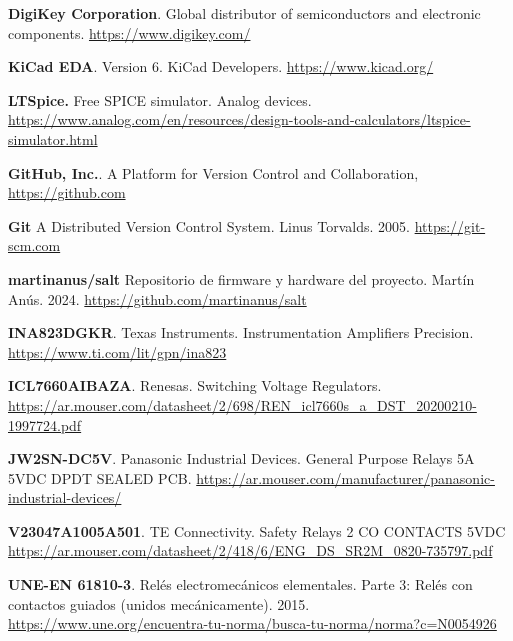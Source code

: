 \begin{thebibliography}{30}
\textbf{DigiKey Corporation}. Global distributor of semiconductors and electronic components. \href{https://www.digikey.com/}{https://www.digikey.com/}


\textbf{KiCad EDA}. Version 6. KiCad Developers.
\href{https://www.kicad.org/}{https://www.kicad.org/}


\textbf{LTSpice.} Free SPICE simulator. Analog devices.
\href{https://www.analog.com/en/resources/design-tools-and-calculators/ltspice-simulator.html}{https://www.analog.com/en/resources/design-tools-and-calculators/ltspice-simulator.html}


\textbf{GitHub, Inc.}. A Platform for Version Control and Collaboration,
\href{https://github.com}{https://github.com}


\textbf{Git} A Distributed Version Control System. Linus Torvalds. 2005.
\href{https://git-scm.com}{https://git-scm.com}


\textbf{martinanus/salt} Repositorio de firmware y hardware del proyecto. Martín Anús. 2024. \href{https://github.com/martinanus/salt}{https://github.com/martinanus/salt}



\textbf{INA823DGKR}. Texas Instruments. Instrumentation Amplifiers Precision. 
\href{https://www.ti.com/lit/gpn/ina823}{https://www.ti.com/lit/gpn/ina823}


\textbf{ICL7660AIBAZA}. Renesas. Switching Voltage Regulators. 
\href{https://ar.mouser.com/datasheet/2/698/REN_icl7660s_a_DST_20200210-1997724.pdf}{https://ar.mouser.com/datasheet/2/698/REN\_icl7660s\_a\_DST\_20200210-1997724.pdf}

\textbf{JW2SN-DC5V}. Panasonic Industrial Devices. General Purpose Relays 5A 5VDC DPDT SEALED PCB. 
\href{https://ar.mouser.com/manufacturer/panasonic-industrial-devices/}{https://ar.mouser.com/manufacturer/panasonic-industrial-devices/}


\textbf{V23047A1005A501}. TE Connectivity. Safety Relays 2 CO CONTACTS 5VDC
\href{https://ar.mouser.com/datasheet/2/418/6/ENG_DS_SR2M_0820-735797.pdf}{https://ar.mouser.com/datasheet/2/418/6/ENG\_DS\_SR2M\_0820-735797.pdf}

\textbf{UNE-EN 61810-3}. Relés electromecánicos elementales. Parte 3: Relés con contactos guiados (unidos mecánicamente). 2015. 
\href{https://www.une.org/encuentra-tu-norma/busca-tu-norma/norma?c=N0054926}{https://www.une.org/encuentra-tu-norma/busca-tu-norma/norma?c=N0054926}



\end{thebibliography}
